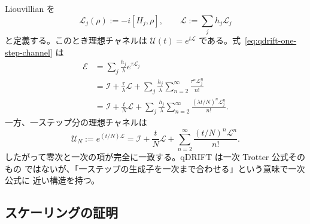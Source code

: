 \documentclass[uplatex,dvipdfmx,11pt,a4paper]{jsarticle}
\newcommand{\cE}{\mathcal{E}}
\newcommand{\cI}{\mathcal{I}}
\newcommand{\cL}{\mathcal{L}}
\newcommand{\cU}{\mathcal{U}}
\begin{document}
Liouvillian を
\begin{equation}
  \cL_j(\rho):=-i[H_j,\rho],
  \qquad
  \cL:=\sum_jh_j\cL_j
\end{equation}
と定義する。このとき理想チャネルは
$\cU(t)=e^{t\cL}$ である。式~\eqref{eq:qdrift-one-step-channel} は
\begin{align}
  \cE
  &=\sum_j\frac{h_j}{\lambda}e^{\tau\cL_j}\\
  &=\cI+\frac{\tau}{\lambda}\cL
    +\sum_j\frac{h_j}{\lambda}
      \sum_{n=2}^{\infty}\frac{\tau^n\cL_j^n}{n!}\\
  &=\cI+\frac{t}{N}\cL
    +\sum_j\frac{h_j}{\lambda}
      \sum_{n=2}^{\infty}\frac{(\lambda t/N)^n\cL_j^n}{n!}.
  \label{eq:qdrift-channel-expansion}
\end{align}
一方、一ステップ分の理想チャネルは
\begin{equation}
  \cU_N:=e^{(t/N)\cL}
  =\cI+\frac{t}{N}\cL
   +\sum_{n=2}^{\infty}\frac{(t/N)^n\cL^n}{n!}.
  \label{eq:ideal-channel-expansion}
\end{equation}
したがって零次と一次の項が完全に一致する。qDRIFT は一次 Trotter 公式そのもの
ではないが、「一ステップの生成子を一次まで合わせる」という意味で一次公式に
近い構造を持つ。

\subsection{スケーリングの証明}
\end{document}
